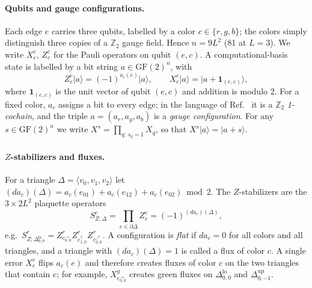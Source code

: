 \documentclass[a4paper]{article}
\newcommand{\rd}{r}
\newcommand{\gr}{g}
\newcommand{\bl}{b}
\newcommand{\GF}{\mathrm{GF}(2)}
\providecommand{\ket}[1]{\ensuremath{|#1\rangle}}
\newcommand{\eh}[1]{e^{\rightarrow}_{#1}}   %
\newcommand{\ev}[1]{e^{\uparrow}_{#1}}      %
\newcommand{\ed}[1]{e^{\nearrow}_{#1}}      %
\newcommand{\tlo}[1]{\Delta^{\mathrm{lo}}_{#1}}
\newcommand{\tup}[1]{\Delta^{\mathrm{up}}_{#1}}
\begin{document}
\paragraph{Qubits and gauge configurations.}
Each edge $e$ carries three qubits, labelled by a color $c\in\{\rd,\gr,\bl\}$; the colors simply distinguish three copies of a $\mathbb{Z}_2$ gauge field. Hence $n=9L^2$ (81 at $L=3$). We write $X^c_e$, $Z^c_e$ for the Pauli operators on qubit $(e,c)$. A computational-basis state is labelled by a bit string $a\in\GF^{n}$, with
\begin{equation}
  Z^c_e\ket{a}=(-1)^{a_c(e)}\ket{a},\qquad X^c_e\ket{a}=\ket{a+\mathbf 1_{(e,c)}},
  \label{eq:basis}
\end{equation}
where $\mathbf 1_{(e,c)}$ is the unit vector of qubit $(e,c)$ and addition is modulo 2. For a fixed color, $a_c$ assigns a bit to every edge; in the language of Ref.~\cite{kobayashi2025clifford} it is a $\mathbb{Z}_2$ \emph{1-cochain}, and the triple $a=(a_\rd,a_\gr,a_\bl)$ is a \emph{gauge configuration}. For any $s\in\GF^n$ we write $X^s=\prod_{q:\,s_q=1}X_q$, so that $X^s\ket{a}=\ket{a+s}$.

\paragraph{$Z$-stabilizers and fluxes.}
For a triangle $\Delta=\langle v_0,v_1,v_2\rangle$ let $(da_c)(\Delta)=a_c(e_{01})+a_c(e_{12})+a_c(e_{02})\bmod 2$. The $Z$-stabilizers are the $3\times2L^2$ plaquette operators
\begin{equation}
  S^{c}_{Z;\Delta}=\prod_{e\in\partial \Delta}Z^{c}_e=(-1)^{(da_c)(\Delta)},
  \label{eq:zstab}
\end{equation}
e.g.\ $S^\rd_{Z;\tlo{0,0}}=Z^\rd_{\eh{0,0}}Z^\rd_{\ev{1,0}}Z^\rd_{\ed{0,0}}$. A configuration is \emph{flat} if $da_c=0$ for all colors and all triangles, and a triangle with $(da_c)(\Delta)=1$ is called a flux of color $c$. A single error $X^c_e$ flips $a_c(e)$ and therefore creates fluxes of color $c$ on the two triangles that contain $e$; for example, $X^\gr_{\eh{0,0}}$ creates green fluxes on $\tlo{0,0}$ and $\tup{0,-1}$.
\end{document}

